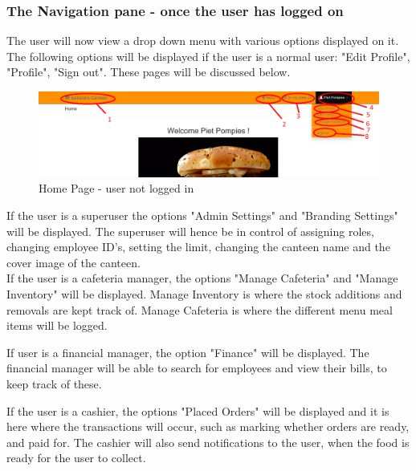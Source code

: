 \documentclass[a4paper,12pt]{article}
\begin{document}
\subsubsection{The Navigation pane - once the user has logged on}
The user will now view a drop down menu with various options displayed on it. The following options will be displayed if the user is a normal user: "Edit Profile", "Profile", "Sign out". These pages will be discussed below.

\begin{figure}[H]
  \centering
    \includegraphics[width=1.0\textwidth]{screenshots/HomePage2.png}
    \caption{Home Page - user not logged in } 
\end{figure}

If the user is a superuser the options "Admin Settings" and "Branding Settings" will be displayed. The superuser will hence be in control of assigning roles, changing employee ID's, setting the limit, changing the canteen name and the cover image of the canteen.  
\\
If the user is a cafeteria manager, the options "Manage Cafeteria" and "Manage Inventory" will be displayed. Manage Inventory is where the stock additions and removals are kept track of. Manage Cafeteria is where the different menu meal items will be logged.

If user is a financial manager, the option "Finance" will be displayed. The financial manager will be able to search for employees and view their bills, to keep track of these.

If the user is a cashier, the options "Placed Orders" will be displayed and it is here where the transactions will occur, such as marking whether orders are ready, and paid for. The cashier will also send notifications to the user, when the food is ready for the user to collect. 
\end{document}
